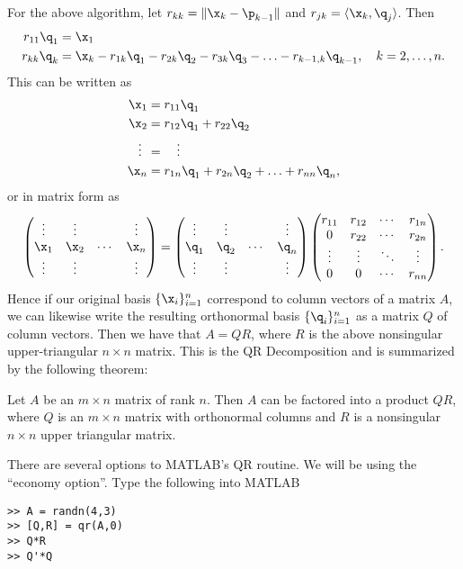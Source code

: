 For the above algorithm, let $r_{k k} = \|\x_k - \p_{k-1}\|$ and
$r_{j k} = \langle \x_k, \q_j\rangle$.  Then
\begin{align*}
r_{1 1} \q_1 &= \x_1\\
r_{k k} \q_k &= \x_k - r_{1 k} \q_1 - r_{2 k} \q_2 - r_{3 k} \q_3 -
\ldots - r_{k-1, k} \q_{k-1},\quad k=2,\ldots,n.
\end{align*}
This can be written as
\begin{align*}
\x_1 &= r_{1 1} \q_1\\
\x_2 &= r_{1 2} \q_1 + r_{2 2} \q_2\\
\vdots \:\: &= \quad \vdots\\
\x_n &= r_{1 n} \q_1 + r_{2 n} \q_2 + \ldots + r_{n n} \q_{n},
\end{align*}
or in matrix form as
\[
\begin{pmatrix}
\vdots & \vdots & & \vdots\\
\x_1 & \x_2 & \cdots & \x_n\\
\vdots & \vdots & & \vdots
\end{pmatrix}
=
\begin{pmatrix}
\vdots & \vdots & & \vdots\\
\q_1 & \q_2 & \cdots & \q_n\\
\vdots & \vdots & & \vdots
\end{pmatrix}
\begin{pmatrix}
r_{1 1} & r_{1 2} & \cdots & r_{1 n}\\
0 & r_{2 2} & \cdots & r_{2 n}\\
\vdots & \vdots & \ddots & \vdots\\
0 & 0 & \cdots & r_{n n}
\end{pmatrix}.
\]
Hence if our original basis $\{\x_i\}_{i=1}^n$ correspond to column
vectors of a matrix $A$, we can likewise write the resulting
orthonormal basis $\{\q_i\}_{i=1}^n$ as a matrix $Q$ of column
vectors.  Then we have that $A = Q R$, where $R$ is the above
nonsingular upper-triangular $n\times n$ matrix.  This is the QR
Decomposition and is summarized by the following theorem:
\vspace{5mm}
\begin{theorem}
Let $A$ be an $m\times n$ matrix of rank $n$.  Then $A$ can be
factored into a product $Q R$, where $Q$ is an $m\times n$ matrix
with orthonormal columns and $R$ is a nonsingular $n \times n$ upper
triangular matrix.
\end{theorem}

\begin{matlab}
There are several options to MATLAB's QR routine.  We will be using
the ``economy option''.  Type the following into MATLAB
\begin{lstlisting}[style=matlab]
>> A = randn(4,3)
>> [Q,R] = qr(A,0)
>> Q*R
>> Q'*Q
\end{lstlisting}
\end{matlab}

